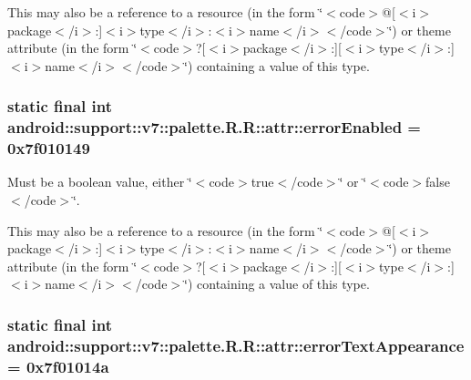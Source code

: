 This may also be a reference to a resource (in the form \char`\"{}$<$code$>$@\mbox{[}$<$i$>$package$<$/i$>$:\mbox{]}$<$i$>$type$<$/i$>$:$<$i$>$name$<$/i$>$$<$/code$>$\char`\"{}) or theme attribute (in the form \char`\"{}$<$code$>$?\mbox{[}$<$i$>$package$<$/i$>$:\mbox{]}\mbox{[}$<$i$>$type$<$/i$>$:\mbox{]}$<$i$>$name$<$/i$>$$<$/code$>$\char`\"{}) containing a value of this type. \hypertarget{classandroid_1_1support_1_1v7_1_1palette_1_1_r_1_1attr_7b05071a27c855624ea2b4789d204931}{
\subsubsection[{errorEnabled}]{\setlength{\rightskip}{0pt plus 5cm}static final int android::support::v7::palette.R.R::attr::errorEnabled = 0x7f010149}}
\label{classandroid_1_1support_1_1v7_1_1palette_1_1_r_1_1attr_7b05071a27c855624ea2b4789d204931}


Must be a boolean value, either \char`\"{}$<$code$>$true$<$/code$>$\char`\"{} or \char`\"{}$<$code$>$false$<$/code$>$\char`\"{}. 

This may also be a reference to a resource (in the form \char`\"{}$<$code$>$@\mbox{[}$<$i$>$package$<$/i$>$:\mbox{]}$<$i$>$type$<$/i$>$:$<$i$>$name$<$/i$>$$<$/code$>$\char`\"{}) or theme attribute (in the form \char`\"{}$<$code$>$?\mbox{[}$<$i$>$package$<$/i$>$:\mbox{]}\mbox{[}$<$i$>$type$<$/i$>$:\mbox{]}$<$i$>$name$<$/i$>$$<$/code$>$\char`\"{}) containing a value of this type. \hypertarget{classandroid_1_1support_1_1v7_1_1palette_1_1_r_1_1attr_9009690fbe8f0aa6ccc6d702b46be3c1}{
\subsubsection[{errorTextAppearance}]{\setlength{\rightskip}{0pt plus 5cm}static final int android::support::v7::palette.R.R::attr::errorTextAppearance = 0x7f01014a}}
\label{classandroid_1_1support_1_1v7_1_1palette_1_1_r_1_1attr_9009690fbe8f0aa6ccc6d702b46be3c1}


